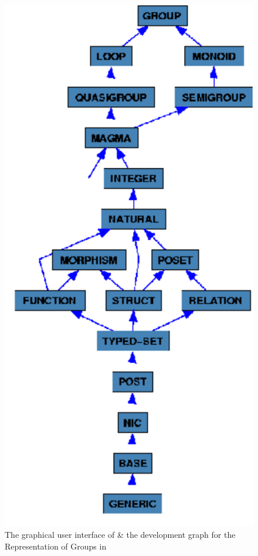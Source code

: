 {\begin{figure}[t]
\begin{minipage}[b]{.15\textwidth}
      \hspace*{-1.7cm}\includegraphics[width=1.25\textwidth]{projects/maya/omdoc-group}
  \end{minipage}
  \caption{The graphical user interface of {\maya} \& the development graph for the {\omdoc} Representation of Groups in {\mbase}}\label{fig:maya-omdoc-group}
\end{figure}
}


